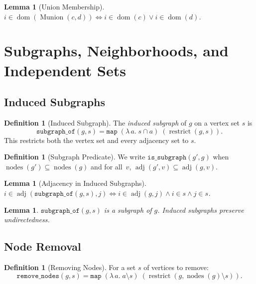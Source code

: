 \documentclass[11pt]{article}
\theoremstyle{plain}
\newtheorem{lemma}[theorem]{Lemma}
\theoremstyle{definition}
\newtheorem{definition}[theorem]{Definition}
\theoremstyle{remark}
\newcommand{\adj}{\operatorname{adj}}
\newcommand{\nodes}{\operatorname{nodes}}
\newcommand{\Munion}{\operatorname{Munion}}
\newcommand{\restrict}{\operatorname{restrict}}
\begin{document}
\begin{lemma}[Union Membership]
\label{lem:munion-in}
$i \in \operatorname{dom}(\Munion(c,d)) \iff i \in \operatorname{dom}(c) \lor i \in \operatorname{dom}(d)$.
\end{lemma}

\section{Subgraphs, Neighborhoods, and Independent Sets}
\label{sec:subgraph}

\subsection{Induced Subgraphs}

\begin{definition}[Induced Subgraph]
The \emph{induced subgraph} of $g$ on a vertex set $s$ is
\[
  \texttt{subgraph\_of}(g, s) = \texttt{map}\;(\lambda\, a.\; s \cap a)\;(\restrict(g, s)).
\]
This restricts both the vertex set and every adjacency set to $s$.
\end{definition}

\begin{definition}[Subgraph Predicate]
We write $\texttt{is\_subgraph}(g', g)$ when
$\nodes(g') \subseteq \nodes(g)$ and for all~$v$, $\adj(g', v) \subseteq \adj(g, v)$.
\end{definition}

\begin{lemma}[Adjacency in Induced Subgraphs]
$i \in \adj(\texttt{subgraph\_of}(g, s), j) \iff i \in \adj(g, j) \wedge i \in s \wedge j \in s$.
\end{lemma}

\begin{lemma}
$\texttt{subgraph\_of}(g, s)$ is a subgraph of $g$. Induced subgraphs preserve undirectedness.
\end{lemma}

\subsection{Node Removal}

\begin{definition}[Removing Nodes]
For a set $s$ of vertices to remove:
\[
  \texttt{remove\_nodes}(g, s) = \texttt{map}\;(\lambda\, a.\; a \setminus s)\;(\restrict(g, \nodes(g) \setminus s)).
\]
\end{definition}
\end{document}
